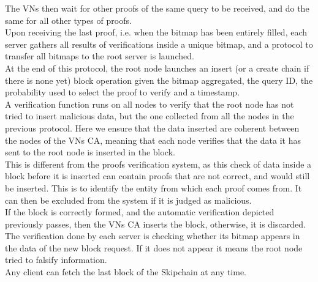 \documentclass{article}
\begin{document}
The VNs then wait for other proofs of the same query to be received, and do the same for all other types of proofs.\\
Upon receiving the last proof, i.e. when the bitmap has been entirely filled, each server gathers all results of verifications inside a unique bitmap, and a protocol to transfer all bitmaps to the root server is launched.\\
At the end of this protocol, the root node launches an insert (or a create chain if there is none yet) block operation given the bitmap aggregated, the query ID, the probability used to select the proof to verify and a timestamp.\\
A verification function runs on all nodes to verify that the root node has not tried to insert malicious data, but the one collected from all the nodes in the previous protocol.
Here we ensure that the data inserted are coherent between the nodes of the VNs CA, meaning that each node verifies that the data it has sent to the root node is inserted in the block.\\
This is different from the proofs verification system, as this check of data inside a block before it is inserted can contain proofs that are not correct, and would still be inserted. This is to identify the entity from which each proof comes from. It can then be excluded from the system if it is judged as malicious.\\
If the block is correctly formed, and the automatic verification depicted previously passes, then the VNs CA inserts the block, otherwise, it is discarded. The verification done by each server is checking whether its bitmap appears in the data of the new block request. If it does not appear it means the root node tried to falsify information.\\
Any client can fetch the last block of the Skipchain at any time.\\
\end{document}

